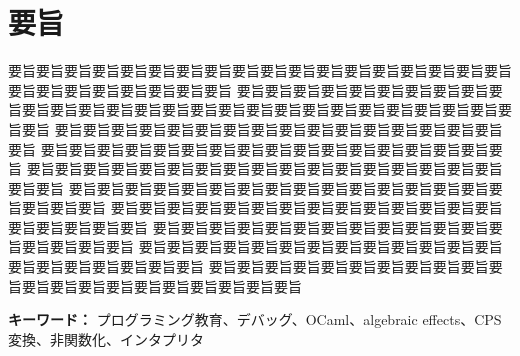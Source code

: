 \chapter*{要旨}

要旨要旨要旨要旨要旨要旨要旨要旨要旨要旨要旨要旨要旨要旨要旨要旨要旨要旨要旨要旨要旨要旨要旨要旨要旨要旨
要旨要旨要旨要旨要旨要旨要旨要旨要旨要旨要旨要旨要旨要旨要旨要旨要旨要旨要旨要旨要旨要旨要旨要旨要旨要旨要旨要旨要旨
要旨要旨要旨要旨要旨要旨要旨要旨要旨要旨要旨要旨要旨要旨要旨要旨要旨
要旨要旨要旨要旨要旨要旨要旨要旨要旨要旨要旨要旨要旨要旨要旨要旨要旨
要旨要旨要旨要旨要旨要旨要旨要旨要旨要旨要旨要旨要旨要旨要旨要旨要旨要旨要旨
要旨要旨要旨要旨要旨要旨要旨要旨要旨要旨要旨要旨要旨要旨要旨要旨要旨要旨要旨
要旨要旨要旨要旨要旨要旨要旨要旨要旨要旨要旨要旨要旨要旨要旨要旨要旨要旨要旨
要旨要旨要旨要旨要旨要旨要旨要旨要旨要旨要旨要旨要旨要旨要旨要旨要旨
要旨要旨要旨要旨要旨要旨要旨要旨要旨要旨要旨要旨要旨要旨要旨要旨要旨要旨要旨要旨
要旨要旨要旨要旨要旨要旨要旨要旨要旨要旨要旨要旨要旨要旨要旨要旨要旨要旨要旨要旨要旨

\vspace{10mm}

{\bf キーワード：}
プログラミング教育、デバッグ、OCaml、algebraic effects、CPS 変換、非関数化、インタプリタ\ 
